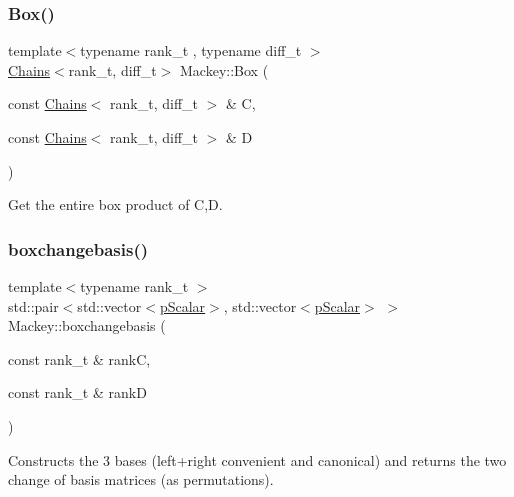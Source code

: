 \subsubsection{\texorpdfstring{Box()}{Box()}\hspace{0.1cm}{\footnotesize\ttfamily [2/2]}}
{\footnotesize\ttfamily template$<$typename rank\+\_\+t , typename diff\+\_\+t $>$ \\
\hyperlink{classMackey_1_1Chains}{Chains}$<$rank\+\_\+t, diff\+\_\+t$>$ Mackey\+::\+Box (\begin{DoxyParamCaption}\item[{const \hyperlink{classMackey_1_1Chains}{Chains}$<$ rank\+\_\+t, diff\+\_\+t $>$ \&}]{C,  }\item[{const \hyperlink{classMackey_1_1Chains}{Chains}$<$ rank\+\_\+t, diff\+\_\+t $>$ \&}]{D }\end{DoxyParamCaption})\hspace{0.3cm}{\ttfamily [inline]}}



Get the entire box product of C,D. 

\mbox{\label{namespaceMackey_a90ea60504ffb74da3a53875368225f8f}} 
\subsubsection{\texorpdfstring{boxchangebasis()}{boxchangebasis()}}
{\footnotesize\ttfamily template$<$typename rank\+\_\+t $>$ \\
std\+::pair$<$std\+::vector$<$\hyperlink{namespaceMackey_a4f147e328c520f568f5d3adf1c75f514}{p\+Scalar}$>$, std\+::vector$<$\hyperlink{namespaceMackey_a4f147e328c520f568f5d3adf1c75f514}{p\+Scalar}$>$ $>$ Mackey\+::boxchangebasis (\begin{DoxyParamCaption}\item[{const rank\+\_\+t \&}]{rankC,  }\item[{const rank\+\_\+t \&}]{rankD }\end{DoxyParamCaption})}



Constructs the 3 bases (left+right convenient and canonical) and returns the two change of basis matrices (as permutations). 

